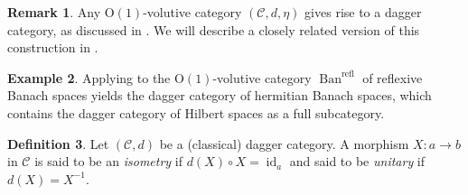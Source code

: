 \documentclass{article}
\newcommand{\id}{\operatorname{id}}%
\newcommand{\Ban}{\operatorname{Ban}}%
\newcommand{\refl}{\operatorname{refl}}%
\newcommand{\Oone}{\operatorname{O(1)}}
\newcommand{\C}{\mathcal{C}}
\numberwithin{equation}{section}
\theoremstyle{definition}
\newtheorem{definition}{Definition}[subsection]
\newtheorem{example}[definition]{Example}
\newtheorem{remark}[definition]{Remark}
\theoremstyle{theorem}
\begin{document}
\begin{remark}\label{Remark: Oone volutive categories give dagger categories}
    Any $\Oone$-volutive category $(\C,d,\eta)$ gives rise to a dagger category, as discussed in \cite{Stehouwer2023DaggerCV}. We will describe a closely 
    related version of this construction in .
\end{remark}
\begin{example}
    Applying  to the $\Oone$-volutive category $\Ban^{\refl}$ of reflexive Banach spaces 
    yields the dagger category of hermitian Banach spaces, which contains the dagger category of Hilbert spaces as a full subcategory. 
\end{example}
\begin{definition}
    Let $(\C,d)$ be a (classical) dagger category. A morphism $X \colon a \to b$ in $\C$ is said to be an \emph{isometry} if $d(X) \circ X = \id_a$ and 
    said to be \emph{unitary} if $d(X) = X^{-1}$.  
\end{definition}
\end{document}
